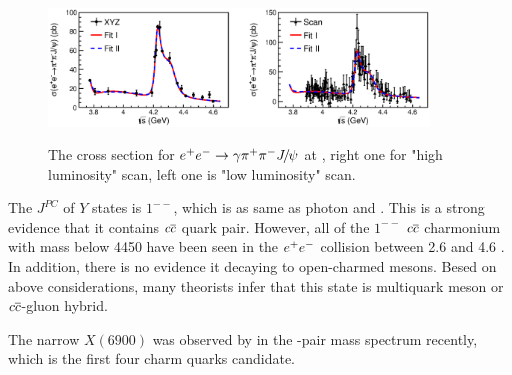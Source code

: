 \begin{figure}[!hbtp]
\centering
   \includegraphics[width=0.9\textwidth]{Figures/01_Introduction/Exotic/neutral_particle/Bes_Y4260} \\%
   \caption{ The cross section for ${e^+}{e^-}\rightarrow{\ensuremath{\gamma}}{\ensuremath{{\pi}^+}}{\ensuremath{{\pi}^-}}{\ensuremath{{J\mskip -3mu/\mskip -2mu\psi}}}$ at \besiii,
   right one for "high luminosity" scan, 
   left one is "low luminosity" scan\supercite{PhysRevLett.118.092001}.}
\label{fig:bes_Y4260}
\end{figure}


The $J^{PC}$ of $Y$ states is $1^{--}$,
which is as same as photon and \jpsi.
This is a strong evidence that it contains ${c}{\overline {{c}}}$ quark pair.
However,
all of the $1^{--}$ ${c}{\overline {{c}}}$ charmonium with mass below 4450 \mev have been seen in the ${e^+}{e^-}$ collision between 2.6 and 4.6 \gev.   
In addition,
there is no evidence it decaying to open-charmed mesons.
Besed on above considerations,
many theorists infer that this state is multiquark meson or ${c}{\overline {{c}}}$-gluon hybrid\supercite{PhysRevD.89.114010,PhysRevD.89.116005}. 


The narrow $X(6900)$ was observed by \lhcb in the \jpsi-pair mass spectrum recently\supercite{PAPER-2020-011},
which is the first four charm quarks candidate.  






















